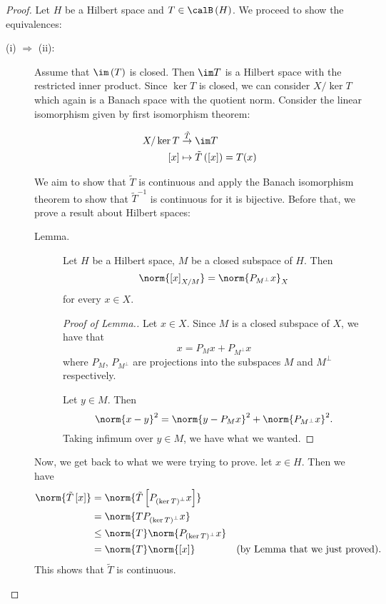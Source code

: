 \begin{proof}
    Let $H$ be a Hilbert space and $T\in \calB \left( H \right)$. We proceed to show the equivalences:
    \begin{description}
	\item[(i) $\Rightarrow$ (ii):] Assume that $\im \left( T \right)$ is closed. Then $\im T$ is a Hilbert space with the restricted inner product. Since $\ker T$ is closed, we can consider $X/\ker T$ which again is a Banach space with the quotient norm. Consider the linear isomorphism given by first isomorphism theorem:

	    \begin{align*}
		X/\ker T &\stackrel{\tilde{T}}{\to} \im T \\
		[x] &\mapsto \tilde{T}\left( \left[ x \right] \right) = T(x)
	    \end{align*}
	    
	    We aim to show that $\tilde{T}$ is continuous and apply the Banach isomorphism theorem to show that $\tilde{T} ^{-1}$ is continuous for it is bijective. Before that, we prove a result about Hilbert spaces:

	    \begin{description}
		\item[Lemma.] Let $H$ be a Hilbert space, $M$ be a closed subspace of $H$. Then 
		    \begin{equation*}
			\norm{\left[ x \right]_{X/M}} = \norm{P_{M^{\perp}}x}_{X}
		    \end{equation*}
		    for every $x \in X$.
		    \begin{proof}[Proof of Lemma.]
			Let $x\in X$. Since $M$ is a closed subspace of $X$, we have that 
		    \begin{equation*}
			x= P_{M}x + P_{M^{\perp}}x
		    \end{equation*}
		    where $P_{M}$, $P_{M^{\perp}}$ are projections into the subspaces $M$ and $M^{\perp}$ respectively.

		    Let $y\in M$. Then
		    \begin{equation*}
			\norm{x-y}^{2} = \norm{y-P_{M}x}^{2} + \norm{P_{M^{\perp}}x}^{2}.
		    \end{equation*}
		    Taking infimum over $y\in M$, we have what we wanted.
		    \end{proof} 
	    \end{description}

	    Now, we get back to what we were trying to prove. let $x\in H$. Then we have
	    \begin{align*}
		\norm{\tilde{T}\left[ x \right]} &= \norm{\tilde{T}\left[ P_{\left( \ker T \right)^{\perp}} x \right]} \\
		&= \norm{TP_{\left( \ker T \right)^{\perp}}x}\\
		&\le \norm{T} \norm{P_{(\ker T)^{\perp}}x} \\
		&= \norm{T} \norm{[x]} & \text{(by Lemma that we just proved)}.
	    \end{align*}
	    This shows that $\tilde{T}$ is continuous.


\end{description}
\end{proof}
